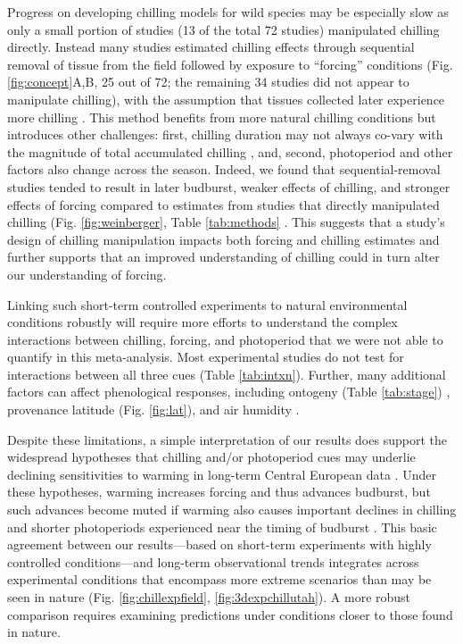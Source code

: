 \documentclass{article}
\begin{document}
\par Progress on developing chilling models for wild species may be especially slow as only a small portion of studies (13 of the total 72 studies) manipulated chilling directly. Instead many studies estimated chilling effects through sequential removal of tissue from the field followed by exposure to ``forcing'' conditions (Fig. \ref{fig:concept}A,B, 25 out of 72; the remaining 34 studies did not appear to manipulate chilling), with the assumption that tissues collected later experience more chilling \emph{\citep{weinberger1950}}. This method benefits from more natural chilling conditions but introduces other challenges: first, chilling duration may not always co-vary with the magnitude of total accumulated chilling \emph{\citep{dennis2003}}, and, second, photoperiod and other factors also change across the season. Indeed, we found that sequential-removal studies tended to result in later budburst, weaker effects of chilling, and stronger effects of forcing compared to estimates from studies that directly manipulated chilling (Fig. \ref{fig:weinberger}, Table \ref{tab:methods} \emph{\citep{weinberger1950,polgar2013}}. This suggests that a study's design of chilling manipulation impacts both forcing and chilling estimates and further supports that an improved understanding of chilling could in turn alter our understanding of forcing. 

\par Linking such short-term controlled experiments to natural environmental conditions robustly will require more efforts to understand the complex interactions between chilling, forcing, and photoperiod that we were not able to quantify in this meta-analysis. Most experimental studies do not test for interactions between all three cues (Table \ref{tab:intxn}). Further, many additional factors can affect phenological responses, including ontogeny (Table \ref{tab:stage}) \emph{\citep[][]{vitasse2013ont}}, provenance latitude (Fig. \ref{fig:lat}), and air humidity \emph{\citep{Laube:2014b}}. 

\par Despite these limitations, a simple interpretation of our results does support the widespread hypotheses that chilling and/or photoperiod cues may underlie declining sensitivities to warming in long-term Central European data \emph{\citep{fu2015,Rutishauser:2008,yu2010}}. Under these hypotheses, warming increases forcing and thus advances budburst, but such advances become muted if warming also causes important declines in chilling and shorter photoperiods experienced near the timing of budburst \emph{\citep{gauzere2019}}. This basic agreement between our results---based on short-term experiments with highly controlled conditions---and long-term observational trends integrates across experimental conditions that encompass more extreme scenarios than may be seen in nature (Fig. \ref{fig:chillexpfield}, \ref{fig:3dexpchillutah}). A more robust comparison requires examining predictions under conditions closer to those found in nature.
\end{document}
